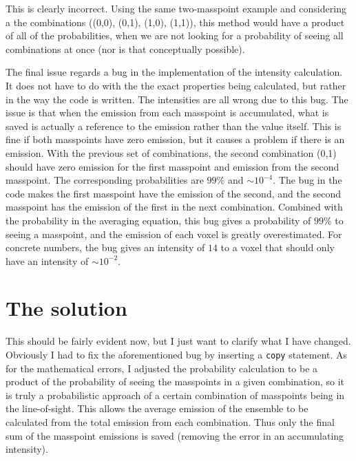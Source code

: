 \documentclass[onecolumn]{article}
\begin{document}
  This is clearly incorrect. Using the same two-masspoint example and considering a the combinations ((0,0), (0,1), (1,0), (1,1)), this method would have a product of all of the probabilities, when we are not looking for a probability of seeing all combinations at once (nor is that conceptually possible).
  
  The final issue regards a bug in the implementation of the intensity calculation. It does not have to do with the the exact properties being calculated, but rather in the way the code is written. The intensities are all wrong due to this bug. The issue is that when the emission from each masspoint is accumulated, what is saved is actually a reference to the emission rather than the value itself. This is fine if both masspoints have zero emission, but it causes a problem if there is an emission. With the previous set of combinations, the second combination (0,1) should have zero emission for the first masspoint and emission from the second masspoint. The corresponding probabilities are $99\%$ and $\sim10^{-4}$. The bug in the code makes the first masspoint have the emission of the second, and the second masspoint has the emission of the first in the next combination. Combined with the probability in the averaging equation, this bug gives a probability of $99\%$ to seeing a masspoint, and the emission of each voxel is greatly overestimated. For concrete numbers, the bug gives an intensity of $14$ to a voxel that should only have an intensity of $\sim 10^{-2}$.
  
  \section{The solution}
  This should be fairly evident now, but I just want to clarify what I have changed. Obviously I had to fix the aforementioned bug by inserting a \texttt{copy} statement. As for the mathematical errors, I adjusted the probability calculation to be a product of the probability of seeing the masspoints in a given combination, so it is truly a probabilistic approach of a certain combination of masspoints being in the line-of-sight. This allows the average emission of the ensemble to be calculated from the total emission from each combination. Thus only the final sum of the masspoint emissions is saved (removing the error in an accumulating intensity).
  
\end{document}

